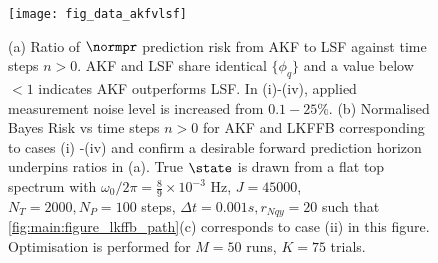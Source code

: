 {%



\begin{figure}[b]
    \texttt{[image: fig\_data\_akfvlsf]}
    \caption{\label{fig:main:fig_data_akfvlsf} (a) Ratio of $\normpr$ prediction risk from AKF to LSF against time steps $n>0$.  AKF and LSF share identical $\{ \phi_q \}$ and  a value below $<1$ indicates AKF outperforms LSF. In (i)-(iv), applied measurement noise level is increased from $0.1 - 25 \%$. (b) Normalised Bayes Risk vs time steps $n>0$ for AKF and LKFFB corresponding to cases (i) -(iv) and confirm a desirable forward prediction horizon underpins ratios in (a). True $\state$ is drawn from a flat top spectrum with $\omega_0 / 2\pi = \frac{8}{9} \times 10^{-3}$ Hz, $J = 45000$, $N_T = 2000, N_P = 100$ steps, $\Delta t = 0.001s, r_{Nqy}=20$ such that \cref{fig:main:figure_lkffb_path}(c) corresponds to case (ii) in this figure. Optimisation is performed for $M=50$ runs, $K=75$ trials.}
\end{figure}

}
